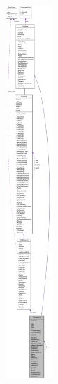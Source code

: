 \begin{figure}[H]
\begin{center}
\leavevmode
\includegraphics[height=400pt]{class_ti_xml_attribute__coll__graph}
\end{center}
\end{figure}
